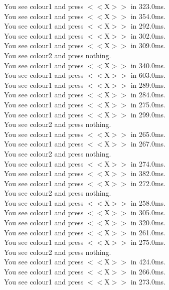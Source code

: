 \documentclass[pdflatex,sn-nature]{sn-jnl}%
\theoremstyle{thmstyleone}%
\theoremstyle{thmstyletwo}%
\theoremstyle{thmstylethree}%
\begin{document}
You see colour1 and press $<<$X$>>$ in 323.0ms. $~$\\ 
You see colour1 and press $<<$X$>>$ in 354.0ms. $~$\\ 
You see colour1 and press $<<$X$>>$ in 292.0ms. $~$\\ 
You see colour1 and press $<<$X$>>$ in 302.0ms. $~$\\ 
You see colour1 and press $<<$X$>>$ in 309.0ms. $~$\\ 
You see colour2 and press nothing. $~$\\ 
You see colour1 and press $<<$X$>>$ in 340.0ms. $~$\\ 
You see colour1 and press $<<$X$>>$ in 603.0ms. $~$\\ 
You see colour1 and press $<<$X$>>$ in 289.0ms. $~$\\ 
You see colour1 and press $<<$X$>>$ in 284.0ms. $~$\\ 
You see colour1 and press $<<$X$>>$ in 275.0ms. $~$\\ 
You see colour1 and press $<<$X$>>$ in 299.0ms. $~$\\ 
You see colour2 and press nothing. $~$\\ 
You see colour1 and press $<<$X$>>$ in 265.0ms. $~$\\ 
You see colour1 and press $<<$X$>>$ in 267.0ms. $~$\\ 
You see colour2 and press nothing. $~$\\ 
You see colour1 and press $<<$X$>>$ in 274.0ms. $~$\\ 
You see colour1 and press $<<$X$>>$ in 382.0ms. $~$\\ 
You see colour1 and press $<<$X$>>$ in 272.0ms. $~$\\ 
You see colour2 and press nothing. $~$\\ 
You see colour1 and press $<<$X$>>$ in 258.0ms. $~$\\ 
You see colour1 and press $<<$X$>>$ in 305.0ms. $~$\\ 
You see colour1 and press $<<$X$>>$ in 320.0ms. $~$\\ 
You see colour1 and press $<<$X$>>$ in 261.0ms. $~$\\ 
You see colour1 and press $<<$X$>>$ in 275.0ms. $~$\\ 
You see colour2 and press nothing. $~$\\ 
You see colour1 and press $<<$X$>>$ in 424.0ms. $~$\\ 
You see colour1 and press $<<$X$>>$ in 266.0ms. $~$\\ 
You see colour1 and press $<<$X$>>$ in 273.0ms. $~$\\ 
\end{document}
